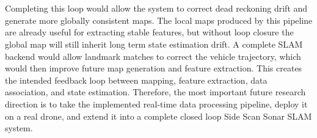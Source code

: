 \\ \\
Completing this loop would allow the system to correct dead reckoning drift and generate more globally consistent maps. The local maps produced by this pipeline are already useful for extracting stable features, but without loop closure the global map will still inherit long term state estimation drift. A complete SLAM backend would allow landmark matches to correct the vehicle trajectory, which would then improve future map generation and feature extraction. This creates the intended feedback loop between mapping, feature extraction, data association, and state estimation. Therefore, the most important future research direction is to take the implemented real-time data processing pipeline, deploy it on a real drone, and extend it into a complete closed loop Side Scan Sonar SLAM system.

\newpage

